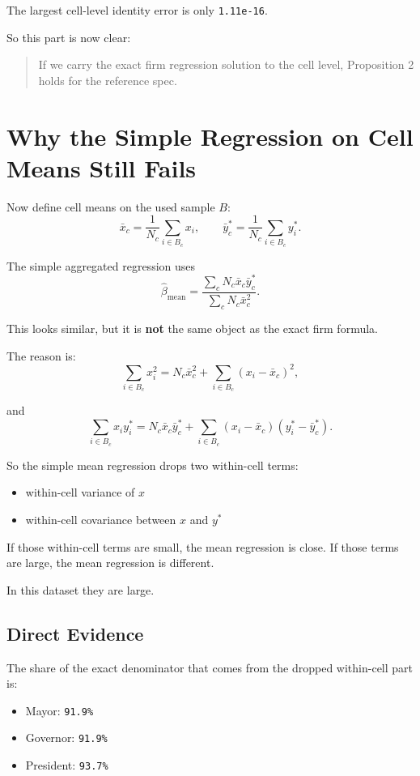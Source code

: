 \documentclass[11pt]{article}
\begin{document}
The largest cell-level identity error is only \texttt{1.11e-16}.

So this part is now clear:
\begin{quote}
If we carry the exact firm regression solution to the cell level, Proposition 2 holds for the reference spec.
\end{quote}

\section{Why the Simple Regression on Cell Means Still Fails}

Now define cell means on the used sample $B$:
\[
\bar x_c = \frac{1}{N_c}\sum_{i \in B_c} x_i,
\qquad
\bar y_c^* = \frac{1}{N_c}\sum_{i \in B_c} y_i^*.
\]

The simple aggregated regression uses
\[
\hat\beta_{\text{mean}} =
\frac{\sum_c N_c \bar x_c \bar y_c^*}{\sum_c N_c \bar x_c^2}.
\]

This looks similar, but it is \textbf{not} the same object as the exact firm formula.

The reason is:
\[
\sum_{i \in B_c} x_i^2
=
N_c \bar x_c^2
+
\sum_{i \in B_c} (x_i - \bar x_c)^2,
\]

and
\[
\sum_{i \in B_c} x_i y_i^*
=
N_c \bar x_c \bar y_c^*
+
\sum_{i \in B_c} (x_i - \bar x_c)(y_i^* - \bar y_c^*).
\]

So the simple mean regression drops two within-cell terms:
\begin{itemize}
  \item within-cell variance of $x$
  \item within-cell covariance between $x$ and $y^*$
\end{itemize}

If those within-cell terms are small, the mean regression is close. If those terms are large, the mean regression is different.

In this dataset they are large.

\subsection*{Direct Evidence}

The share of the exact denominator that comes from the dropped within-cell part is:
\begin{itemize}
  \item Mayor: \texttt{91.9\%}
  \item Governor: \texttt{91.9\%}
  \item President: \texttt{93.7\%}
\end{itemize}
\end{document}
